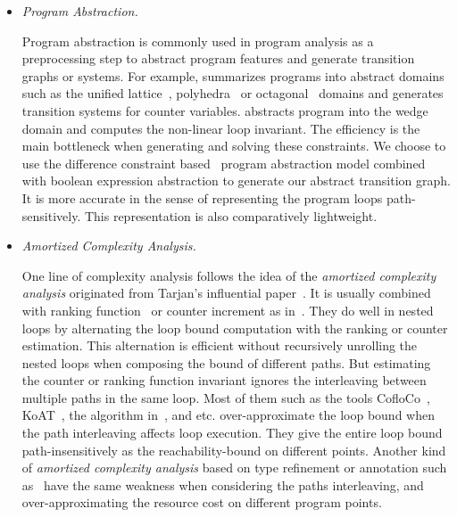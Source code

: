 \begin{itemize}
\item \emph{Program Abstraction.}

Program abstraction is commonly used in program analysis as a preprocessing step to abstract program features and generate transition graphs or systems. For example, \cite{GulwaniZ10} summarizes programs into abstract domains such as the unified lattice~\cite{CousotH78}, polyhedra~\cite{CousotC77} or octagonal~\cite{Mine06} domains and generates transition systems for counter variables.
\cite{KincaidCBR18} abstracts program into the wedge domain and computes the non-linear loop invariant.
The efficiency is the main bottleneck when generating and solving these constraints.
We choose to use the difference constraint based~\cite{SinnZV17,SinnZV14} program abstraction model combined with boolean expression abstraction to generate our abstract transition graph.
It is more accurate in the sense of representing the program loops path-sensitively. This representation is also comparatively lightweight.

\item \emph{Amortized Complexity Analysis.}

One line of complexity analysis follows the idea of the \emph{amortized complexity analysis} originated from Tarjan's influential paper~\cite{PotechinP17}. It is usually combined with ranking function~\cite{BradleyMS05,CookSZ13,Zuleger18} or counter increment as in~\cite{ZulegerGSV11,SinnZV14,SinnZV17,LuCT21,AliasDFG10}.
They do well in nested loops by alternating the loop bound computation with the ranking or counter estimation. This alternation is efficient without recursively unrolling the nested loops when composing the bound of different paths.
  But estimating the counter or ranking function invariant ignores the interleaving between multiple paths in the same loop.
Most of them such as the tools CofloCo~\cite{Montoya17,Flores-MontoyaH14,Flores-Montoya16}, KoAT~\cite{BrockschmidtEFFG16,BrockschmidtEFFG14,FalkeKS12,FalkeKS11}, the algorithm in~\cite{LuCT21}, and etc. over-approximate the loop bound when the path interleaving affects loop execution. They give the entire loop bound path-insensitively as the reachability-bound on different points. Another kind of \emph{amortized complexity analysis} based on type refinement or annotation such as~\cite{CraryW00,JostHLH10,CicekBG0H17,RajaniG0021,CarbonneauxHS15} have the same weakness when considering the paths interleaving, and over-approximating the resource cost on different program points.


\end{itemize}
